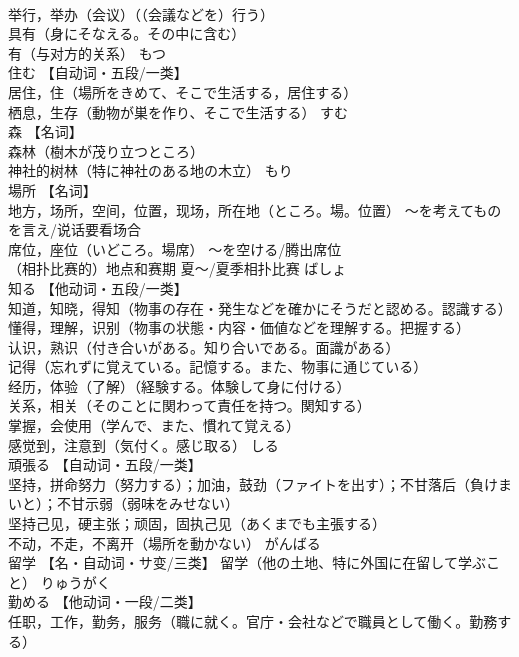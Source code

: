 \documentclass[8pt]{extreport}
\begin{document}
\begin{CJK}{UTF8}{min}
\\	举行，举办（会议）（（会議などを）行う） 
\\	具有（身にそなえる。その中に含む） 
\\	有（与对方的关系）	もつ	
\\	住む	【自动词・五段/一类】 
\\	居住，住（場所をきめて、そこで生活する，居住する） 
\\	栖息，生存（動物が巣を作り、そこで生活する）	すむ	
\\	森	【名词】 
\\	森林（樹木が茂り立つところ） 
\\	神社的树林（特に神社のある地の木立）	もり	
\\	場所	【名词】 
\\	地方，场所，空间，位置，现场，所在地（ところ。場。位置） ～を考えてものを言え/说话要看场合 
\\	席位，座位（いどころ。場席） ～を空ける/腾出席位 
\\	（相扑比赛的）地点和赛期 夏～/夏季相扑比赛	ばしょ	
\\	知る	【他动词・五段/一类】 
\\	知道，知晓，得知（物事の存在・発生などを確かにそうだと認める。認識する） 
\\	懂得，理解，识别（物事の状態・内容・価値などを理解する。把握する） 
\\	认识，熟识（付き合いがある。知り合いである。面識がある） 
\\	记得（忘れずに覚えている。記憶する。また、物事に通じている） 
\\	经历，体验（了解）（経験する。体験して身に付ける） 
\\	关系，相关（そのことに関わって責任を持つ。関知する） 
\\	掌握，会使用（学んで、また、慣れて覚える） 
\\	感觉到，注意到（気付く。感じ取る）	しる	
\\	頑張る	【自动词・五段/一类】 
\\	坚持，拼命努力（努力する）；加油，鼓劲（ファイトを出す）；不甘落后（負けまいと）；不甘示弱（弱味をみせない） 
\\	坚持己见，硬主张；顽固，固执己见（あくまでも主張する） 
\\	不动，不走，不离开（場所を動かない）	がんばる	
\\	留学	【名・自动词・サ变/三类】 留学（他の土地、特に外国に在留して学ぶこと）	りゅうがく	
\\	勤める	【他动词・一段/二类】 
\\	任职，工作，勤务，服务（職に就く。官庁・会社などで職員として働く。勤務する） 

\end{CJK}
\end{document}
